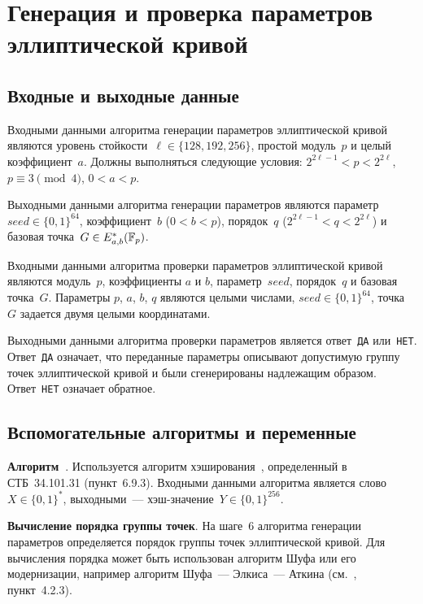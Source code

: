 \section{Генерация и проверка параметров эллиптической кривой}\label{PARAMS}

\subsection{Входные и выходные данные}

Входными данными алгоритма генерации параметров эллиптической кривой 
являются уровень стойкости~$\ell\in\{128,192,256\}$, 
простой модуль~$p$ и целый коэффициент~$a$.
%
Должны выполняться следующие условия: $2^{2\ell-1}<p<2^{2\ell}$,
$p\equiv 3\pmod{4}$, $0<a<p$.

Выходными данными алгоритма генерации параметров 
являются параметр~$seed\in\{0,1\}^{64}$, 
коэффициент~$b$ ($0<b<p$), 
порядок~$q$ ($2^{2\ell-1}<q<2^{2\ell}$) 
и базовая точка~$G\in E_{a,b}^*(\mathbb{F}_p)$.

Входными данными алгоритма проверки параметров эллиптической кривой
являются модуль~$p$, коэффициенты $a$ и $b$, 
параметр~$seed$, порядок~$q$ и базовая точка~$G$.
%
Параметры $p$, $a$, $b$, $q$ являются целыми числами,
$seed\in\{0,1\}^{64}$, точка~$G$ задается двумя целыми координатами.

Выходными данными алгоритма проверки параметров 
является ответ~\texttt{ДА} или~\texttt{НЕТ}. 
Ответ~\texttt{ДА} означает, что переданные параметры 
описывают допустимую группу точек эллиптической кривой
и были сгенерированы надлежащим образом.
Ответ~\texttt{НЕТ} означает обратное.

\subsection{Вспомогательные алгоритмы и переменные}
\label{PARAMS.Aux}

{\bf Алгоритм~}.
Используется алгоритм хэширования~,
определенный в СТБ~34.101.31 (пункт~6.9.3).
Входными данными алгоритма является слово~$X\in\{0,1\}^*$,
выходными~--- хэш-значение~$Y\in\{0,1\}^{256}$.

{\bf Вычисление порядка группы точек}.
На шаге~6 алгоритма генерации параметров 
определяется порядок группы точек эллиптической кривой.
%
Для вычисления порядка может быть использован алгоритм Шуфа
или его модернизации, например алгоритм Шуфа~--- Элкиса~--- Аткина
(см.~\cite{ECC}, пункт~4.2.3).

